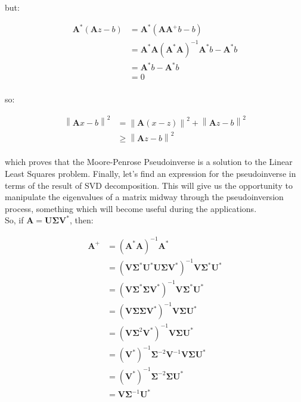 \documentclass{article}
\newcommand{\norm}[1]{\left\lVert#1\right\rVert}
\begin{document}
but:

\begin{align*}
\mathbf{A}^* (\mathbf{A} z - b) &= \mathbf{A}^* (\mathbf{A} \mathbf{A}^+ b - b) \\
&= \mathbf{A}^* \mathbf{A} (\mathbf{A}^* \mathbf{A})^{-1} \mathbf{A}^* b - \mathbf{A}^* b \\
&= \mathbf{A}^* b - \mathbf{A}^* b \\
&= 0 \\
\end{align*}

so:

\begin{align*}
\norm{\mathbf{A} x - b}^2 &= \norm{\mathbf{A} (x - z)}^2 + \norm{\mathbf{A} z - b}^2 \\
&\geq \norm{\mathbf{A} z - b}^2 \\
\end{align*}

which proves that the Moore-Penrose Pseudoinverse is a solution to the Linear Least Squares problem. Finally, let's find an expression for the pseudoinverse in terms of the result of SVD decomposition. This will give us the opportunity to manipulate the eigenvalues of a matrix midway through the pseudoinversion process, something which will become useful during the applications. \\

So, if $\mathbf{A} = \mathbf{U} \mathbf{\Sigma} \mathbf{V}^*$, then:

\begin{align*}
\mathbf{A}^+ &= (\mathbf{A}^* \mathbf{A})^{-1} \mathbf{A}^* \\
&= (\mathbf{V} \mathbf{\Sigma}^* \mathbf{U}^* \mathbf{U} \mathbf{\Sigma} \mathbf{V}^*)^{-1} \mathbf{V} \mathbf{\Sigma}^* \mathbf{U}^* \\
&= (\mathbf{V} \mathbf{\Sigma}^*  \mathbf{\Sigma} \mathbf{V}^*)^{-1} \mathbf{V} \mathbf{\Sigma}^* \mathbf{U}^* \\
&= (\mathbf{V} \mathbf{\Sigma} \mathbf{\Sigma} \mathbf{V}^*)^{-1} \mathbf{V} \mathbf{\Sigma} \mathbf{U}^* \\
&= (\mathbf{V} \mathbf{\Sigma}^2 \mathbf{V}^*)^{-1} \mathbf{V} \mathbf{\Sigma} \mathbf{U}^* \\
&= (\mathbf{V}^*)^{-1} \mathbf{\Sigma}^{-2} \mathbf{V}^{-1} \mathbf{V} \mathbf{\Sigma} \mathbf{U}^* \\
&= (\mathbf{V}^*)^{-1} \mathbf{\Sigma}^{-2} \mathbf{\Sigma} \mathbf{U}^* \\
&= \mathbf{V} \mathbf{\Sigma}^{-1} \mathbf{U}^* \\
\end{align*}
\end{document}
